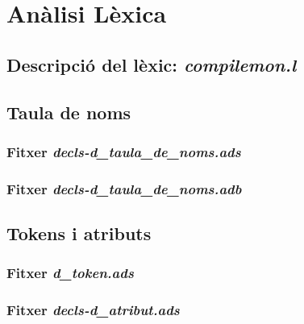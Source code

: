 \section{Anàlisi Lèxica}

\subsection{Descripció del lèxic: \emph{compilemon.l}}

\newpage

\subsection{Taula de noms}
\subsubsection{Fitxer \emph{decls-d\_taula\_de\_noms.ads}}

\newpage

\subsubsection{Fitxer \emph{decls-d\_taula\_de\_noms.adb}}

\newpage

\subsection{Tokens i atributs}
\subsubsection{Fitxer \emph{d\_token.ads}}

\newpage

\subsubsection{Fitxer \emph{decls-d\_atribut.ads}}

\newpage

